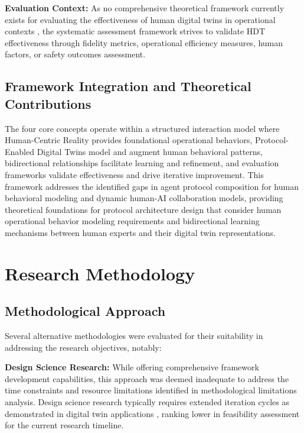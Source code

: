 \documentclass[12pt,a4paper]{article}
\begin{document}
\textbf{Evaluation Context:} As no comprehensive theoretical framework currently exists for evaluating the effectiveness of human digital twins in operational contexts \cite{10.1109/etfa61755.2024.10711109} \cite{10.1016/j.ifacol.2022.09.675}, the systematic assessment framework strives to validate HDT effectiveness through fidelity metrics, operational efficiency measures, human factors, or safety outcomes assessment. 

\subsection{Framework Integration and Theoretical Contributions}

The four core concepts operate within a structured interaction model where Human-Centric Reality provides foundational operational behaviors, Protocol-Enabled Digital Twins model and augment human behavioral patterns, bidirectional relationships facilitate learning and refinement, and evaluation frameworks validate effectiveness and drive iterative improvement. This framework addresses the identified gaps in agent protocol composition for human behavioral modeling and dynamic human-AI collaboration models, providing theoretical foundations for protocol architecture design that consider human operational behavior modeling requirements and bidirectional learning mechanisms between human experts and their digital twin representations.

\section{Research Methodology}
\label{sec:methodology}

\subsection{Methodological Approach}

Several alternative methodologies were evaluated for their suitability in addressing the research objectives, notably:

\textbf{Design Science Research:} While offering comprehensive framework development capabilities, this approach was deemed inadequate to address the time constraints and resource limitations identified in methodological limitations analysis. Design science research typically requires extended iteration cycles as demonstrated in digital twin applications \cite{10.1016/j.esr.2024.101334}, ranking lower in feasibility assessment for the current research timeline.
\end{document}
